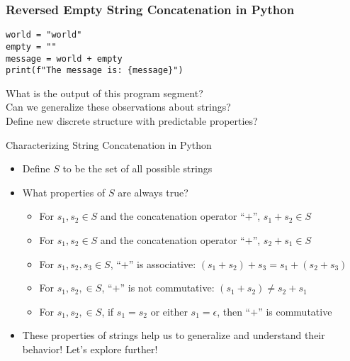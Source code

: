 \documentclass[14pt,aspectratio=169]{beamer}
\begin{document}
%
\begin{frame}[fragile]
  \frametitle{Reversed Empty String Concatenation in Python}
  \begin{minipage}{6in}
    \vspace*{.25in}
    \begin{verbatim}
world = "world"
empty = ""
message = world + empty
print(f"The message is: {message}")
    \end{verbatim}
  \end{minipage}
  \vspace*{.05in}
  \begin{center}
    \normalsize \noindent What is the output of this program segment? \\
    \normalsize \noindent Can we generalize these observations about strings? \\
    \normalsize \noindent Define new discrete structure with predictable properties? \\
  \end{center}
\end{frame}

%
\begin{frame}{Characterizing String Concatenation in Python}
  \begin{itemize}
    \item Define $S$ to be the set of all possible strings
      \vspace*{-.15in}
    \item What properties of $S$ are always true?
      \begin{itemize}
        \item For $s_1, s_2 \in S$ and the concatenation operator ``$+$'', $s_1
          + s_2 \in S$
        \item For $s_1, s_2 \in S$ and the concatenation operator ``$+$'', $s_2
          + s_1 \in S$
        \item For $s_1, s_2, s_3 \in S$, ``$+$'' is associative: $(s_1 + s_2) +
          s_3 = s_1 + (s_2 + s_3)$
        \item For $s_1, s_2, \in S$, ``$+$'' is not commutative: $(s_1 + s_2)
          \neq s_2 + s_1$
        \item For $s_1, s_2, \in S$, if $s_1 = s_2$ or either $s_1 = \epsilon$,
          then ``$+$'' is commutative
      \end{itemize}
      \vspace*{-.2in}
    \item These properties of strings help us to generalize and understand
      their behavior! Let's explore further!
  \end{itemize}
\end{frame}
\end{document}
